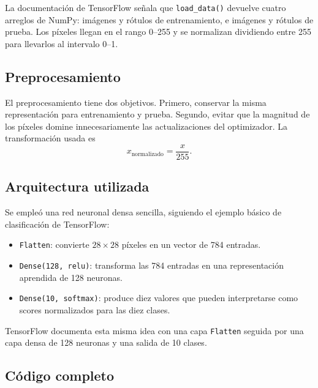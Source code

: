 \documentclass[14pt,twoside]{article}
\begin{document}
La documentación de TensorFlow señala que \texttt{load\_data()} devuelve cuatro arreglos de NumPy: imágenes y rótulos de entrenamiento, e imágenes y rótulos de prueba. Los píxeles llegan en el rango 0--255 y se normalizan dividiendo entre 255 para llevarlos al intervalo 0--1. \cite{tensorflowapi,tensorflowfashion}

\subsection{Preprocesamiento}

El preprocesamiento tiene dos objetivos. Primero, conservar la misma representación para entrenamiento y prueba. Segundo, evitar que la magnitud de los píxeles domine innecesariamente las actualizaciones del optimizador. La transformación usada es
\[
x_{\mathrm{normalizado}}=\frac{x}{255}.
\]

\subsection{Arquitectura utilizada}

Se empleó una red neuronal densa sencilla, siguiendo el ejemplo básico de clasificación de TensorFlow:
\begin{itemize}[leftmargin=1.2cm]
    \item \texttt{Flatten}: convierte $28\times28$ píxeles en un vector de 784 entradas.
    \item \texttt{Dense(128, relu)}: transforma las 784 entradas en una representación aprendida de 128 neuronas.
    \item \texttt{Dense(10, softmax)}: produce diez valores que pueden interpretarse como scores normalizados para las diez clases.
\end{itemize}

TensorFlow documenta esta misma idea con una capa \texttt{Flatten} seguida por una capa densa de 128 neuronas y una salida de 10 clases. \cite{tensorflowfashion}

\subsection{Código completo}
\end{document}
